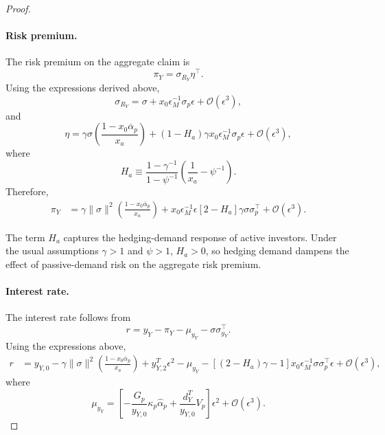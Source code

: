 \begin{proof}
\paragraph{Risk premium.}
The risk premium on the aggregate claim is
\begin{equation}
    \pi_Y=\sigma_{R_Y}\eta^\top.
\end{equation}
Using the expressions derived above,
\begin{equation}
    \sigma_{R_Y}
    =
    \sigma+x_0\epsilon_M^{-1}\sigma_p\epsilon
    +\mathcal O(\epsilon^3),
\end{equation}
and
\begin{equation}
    \eta
    =
    \gamma\sigma\left(\frac{1-x_0\overline{\alpha}_p}{x_a}\right)
    +
    (1-H_a) \gamma x_0\epsilon_M^{-1}\sigma_p\epsilon
    +\mathcal O(\epsilon^3),
\end{equation}
where
\begin{equation}
    H_a
    \equiv
    \frac{1-\gamma^{-1}}{1-\psi^{-1}} \left(\frac{1}{x_a} - \psi^{-1}\right).
\end{equation}
Therefore,
\begin{align}
    \pi_Y
    &=
    \gamma\|\sigma\|^2
    \left(\frac{1-x_0\overline{\alpha}_p}{x_a}\right) 
    +x_0\epsilon_M^{-1}\epsilon
    \left[
        2-H_a
    \right] \gamma \sigma\sigma_p^\top
    +\mathcal O(\epsilon^3).
\end{align}

The term $H_a$ captures the hedging-demand response of active investors. 
Under the usual assumptions $\gamma>1$ and $\psi>1$, $H_a>0$, so hedging demand dampens the effect of passive-demand risk on the aggregate risk premium.

\paragraph{Interest rate.}
The interest rate follows from
\begin{equation}
    r=y_Y-\pi_Y-\mu_{y_Y}-\sigma\sigma_{y_Y}^\top .
\end{equation}
Using the expressions above,
\begin{align}
    r
    &=y_{Y,0}
    -\gamma\|\sigma\|^2
    \left(\frac{1-x_0\overline{\alpha}_p}{x_a}\right)
    +y_{Y,2}^T\epsilon^2
    -\mu_{y_Y} 
    -\left[(2-H_a)\gamma-1\right]
    x_0\epsilon_M^{-1}\sigma\sigma_p^\top\epsilon
    +\mathcal O(\epsilon^3),
\end{align}
where
\begin{equation}
    \mu_{y_Y}
    =
    \left[
        -\frac{G_p}{y_{Y,0}}\kappa_p\hat{\alpha}_p
        +\frac{d_Y^T}{y_{Y,0}}V_p
    \right]\epsilon^2
    +\mathcal O(\epsilon^3).
\end{equation}


\end{proof}
